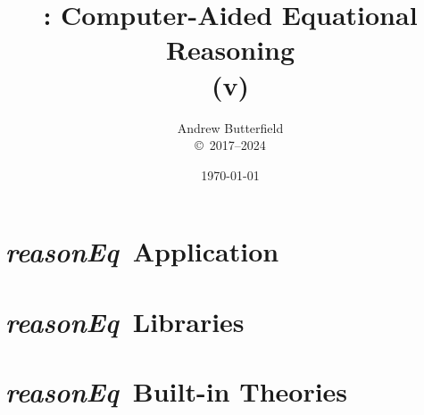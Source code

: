 \documentclass[fleqn,10pt]{report}
\author{
Andrew Butterfield
\\
{\small \copyright\ 2017--2024}
}
\title{
  \reasonEq: Computer-Aided Equational Reasoning
  \\(v\reqVersion)
}
\date{
\today
}
\def\reasonEq{\textit{\textsf{reasonEq}}}
\begin{document}
\maketitle
\setcounter{tocdepth}{1}
\tableofcontents

\part{\reasonEq\ Application}





% 

\part{\reasonEq\ Libraries}


\newpage
\newpage
\newpage


\part{\reasonEq\ Built-in Theories}
\end{document}
